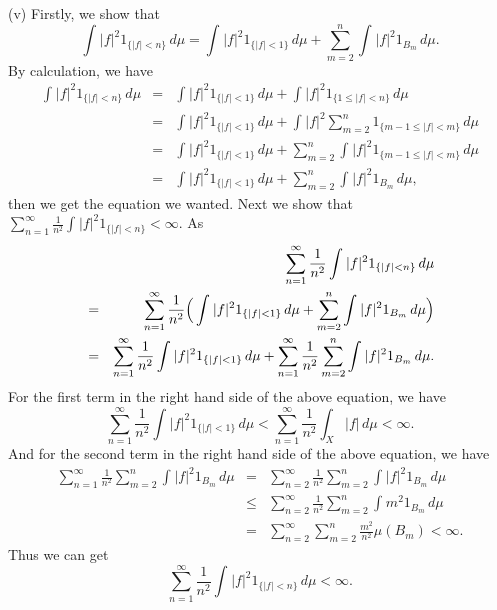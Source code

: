 \documentclass[12pt]{article}
\begin{document}
(v) Firstly, we show that 
\begin{equation*}
    \int_{}^{} |f|^{2} 1_{\{|f| < n\}} \, d \mu = \int_{}^{} |f|^{2} 1_{\{|f| < 1\}} \, d \mu + \sum_{m=2}^{n} \int_{}^{} |f|^{2} 1_{B_{m}} \, d \mu.
\end{equation*}
By calculation, we have
\begin{eqnarray*}
    \int_{}^{} |f|^{2} 1_{\{|f| < n\}} \, d \mu & = & \int_{}^{} |f|^{2} 1_{\{|f| < 1\}} \, d \mu + \int_{}^{} |f|^{2} 1_{\{1 \leq |f| < n\}} \, d \mu \\
    & = & \int_{}^{} |f|^{2} 1_{\{|f| < 1\}} \, d \mu + \int_{}^{} |f|^{2} \sum_{m=2}^{n} 1_{\{m-1 \leq |f| < m\}} \, d \mu \\
    & = & \int_{}^{} |f|^{2} 1_{\{|f| < 1\}} \, d \mu + \sum_{m=2}^{n} \int_{}^{} |f|^{2}  1_{\{m-1 \leq |f| < m\}} \, d \mu \\
    & = & \int_{}^{} |f|^{2} 1_{\{|f| < 1\}} \, d \mu + \sum_{m=2}^{n} \int_{}^{} |f|^{2} 1_{B_{m}} \, d \mu,
\end{eqnarray*}
then we get the equation we wanted. Next we show that $\sum_{n=1}^{\infty} \frac{1}{n^{2}} \int_{}^{} |f|^{2} 1_{\{|f| < n\}} < \infty $. As
\begin{eqnarray*}
   &  & \sum_{n=1}^{\infty} \frac{1}{n^{2}} \int_{}^{} |f|^{2} 1_{\{|f| < n\}} \, d \mu  \\
    & = &  \sum_{n=1}^{\infty} \frac{1}{n^{2}} \Big{(} \int_{}^{} |f|^{2} 1_{\{|f| < 1\}} \, d \mu + \sum_{m=2}^{n} \int_{}^{} |f|^{2} 1_{B_{m}} \, d \mu \Big{)} \\
    & = & \sum_{n=1}^{\infty} \frac{1}{n^{2}} \int_{}^{} |f|^{2} 1_{\{|f| < 1\}} \, d \mu + \sum_{n=1}^{\infty} \frac{1}{n^{2}} \sum_{m=2}^{n} \int_{}^{} |f|^{2} 1_{B_{m}} \, d \mu.
\end{eqnarray*}
For the first term in the right hand side of the above equation, we have
\begin{equation*}
    \sum_{n=1}^{\infty} \frac{1}{n^{2}} \int_{}^{} |f|^{2} 1_{\{|f| < 1\}} \, d \mu < \sum_{n=1}^{\infty} \frac{1}{n^{2}} \int_{X}^{} |f| \, d \mu  < \infty.
\end{equation*}
And for the second term in the right hand side of the above equation, we have
\begin{eqnarray*}
    \sum_{n=1}^{\infty} \frac{1}{n^{2}} \sum_{m=2}^{n} \int_{}^{} |f|^{2} 1_{B_{m}} \, d \mu & = & \sum_{n=2}^{\infty} \frac{1}{n^{2}} \sum_{m=2}^{n} \int_{}^{} |f|^{2} 1_{B_{m}} \, d \mu \\
   & \leq & \sum_{n=2}^{\infty} \frac{1}{n^{2}} \sum_{m=2}^{n} \int_{}^{} m^{2} 1_{B_{m}} \, d \mu \\
   & = & \sum_{n=2}^{\infty} \sum_{m=2}^{n} \frac{m^{2}}{n^{2}} \mu(B_{m}) < \infty.
\end{eqnarray*}
Thus we can get
\begin{equation*}
    \sum_{n=1}^{\infty} \frac{1}{n^{2}} \int_{}^{} |f|^{2} 1_{\{|f| < n\}} \, d \mu  < \infty.
\end{equation*}
\end{document}
